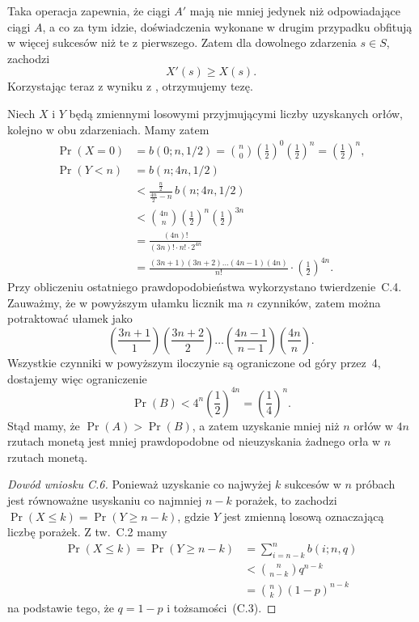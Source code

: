 Taka operacja zapewnia, że ciągi $A'$ mają nie mniej jedynek niż odpowiadające ciągi $A$, a co za tym idzie, doświadczenia wykonane w drugim przypadku obfitują w więcej sukcesów niż te z pierwszego. Zatem dla dowolnego zdarzenia $s\in S$, zachodzi
\[
	X'(s) \ge X(s).
\]
Korzystając teraz z wyniku z , otrzymujemy tezę.


\exercise{} %
\noindent Niech $X$ i $Y$ będą zmiennymi losowymi przyjmującymi liczby uzyskanych orłów, kolejno w obu zdarzeniach. Mamy zatem
\begin{align*}
	\Pr(X=0) &= b(0;n,1/2) = \binom{n}{0}\left(\frac{1}{2}\right)^0\left(\frac{1}{2}\right)^n = \left(\frac{1}{2}\right)^n, \\
	\Pr(Y<n) &= b(n;4n,1/2) \\
	&< \frac{\frac{n}{2}}{\frac{4n}{2}-n}\,b(n;4n,1/2) \\
	&< \binom{4n}{n}\left(\frac{1}{2}\right)^n\left(\frac{1}{2}\right)^{3n} \\
	&= \frac{(4n)!}{(3n)!\cdot n!\cdot 2^{4n}} \\
	&= \frac{(3n+1)(3n+2)\dots(4n-1)(4n)}{n!}\cdot\left(\frac{1}{2}\right)^{4n}.
\end{align*}
Przy obliczeniu ostatniego prawdopodobieństwa wykorzystano twierdzenie~C.4. Zauważmy, że w powyższym ułamku licznik ma $n$ czynników, zatem można potraktować ułamek jako
\[
	\left(\frac{3n+1}{1}\right)\left(\frac{3n+2}{2}\right)\dots\left(\frac{4n-1}{n-1}\right)\left(\frac{4n}{n}\right).
\]
Wszystkie czynniki w powyższym iloczynie są ograniczone od góry przez~4, dostajemy więc ograniczenie
\[
	\Pr(B) < 4^n\left(\frac{1}{2}\right)^{4n} = \left(\frac{1}{4}\right)^n.
\]
Stąd mamy, że $\Pr(A)>\Pr(B)$, a zatem uzyskanie mniej niż $n$ orłów w $4n$ rzutach monetą jest mniej prawdopodobne od nieuzyskania żadnego orła w $n$ rzutach monetą.

\exercise{} %
\begin{proof}[Dowód wniosku C.6]
	Ponieważ uzyskanie co najwyżej $k$ sukcesów w $n$ próbach jest równoważne usyskaniu co najmniej $n-k$ porażek, to zachodzi $\Pr(X\le k)=\Pr(Y\ge n-k)$, gdzie $Y$ jest zmienną losową oznaczającą liczbę porażek. Z tw.~C.2 mamy
	\begin{align*}
		\Pr(X\le k) = \Pr(Y\ge n-k) &= \sum_{i=n-k}^nb(i;n,q) \\
		&< \binom{n}{n-k}q^{n-k} \\
		&= \binom{n}{k}(1-p)^{n-k}
	\end{align*}
	na podstawie tego, że $q=1-p$ i tożsamości~(C.3).
\end{proof}

